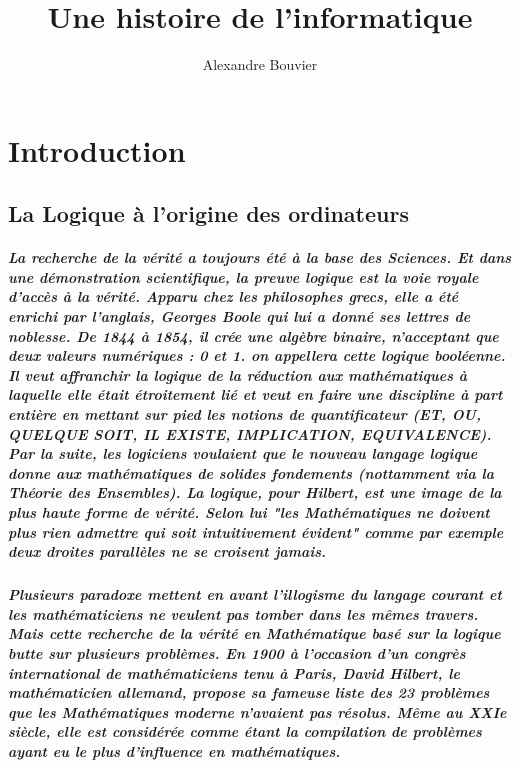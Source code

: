 \documentclass[a4paper, 11pt]{book}
\begin{document}
\title{Une histoire de l'informatique}
\author{Alexandre Bouvier}
\date{}

\mainmatter

\maketitle

\chapter*{ Introduction }

\section*{ La Logique à l'origine des ordinateurs }

\paragraph{
  La recherche de la vérité a toujours été à la base des Sciences. Et dans une démonstration scientifique, la preuve logique est la voie royale d'accès à la vérité. Apparu chez les philosophes grecs, elle a été enrichi par l'anglais, Georges Boole qui lui a donné ses lettres de noblesse. De 1844 à 1854, il crée une algèbre binaire, n'acceptant que deux valeurs numériques : 0 et 1. on appellera cette logique booléenne. Il veut affranchir la logique de la réduction aux mathématiques à laquelle elle était étroitement lié et veut en faire une discipline à part entière en mettant sur pied les notions de quantificateur (ET, OU, QUELQUE SOIT, IL EXISTE, IMPLICATION, EQUIVALENCE). Par la suite, les logiciens voulaient que le nouveau langage logique donne aux mathématiques de solides fondements (nottamment via la Théorie des Ensembles). La logique, pour Hilbert, est une image de la plus haute forme de vérité. Selon lui "les Mathématiques ne doivent plus rien admettre  qui soit intuitivement évident" comme par exemple deux droites parallèles ne se croisent jamais.
}

\paragraph{
  Plusieurs paradoxe mettent en avant l'illogisme du langage courant et les mathématiciens ne veulent pas tomber dans les mêmes travers. Mais cette recherche de la vérité en Mathématique basé sur la logique butte sur plusieurs problèmes. En 1900 à l'occasion d'un congrès international de mathématiciens tenu à Paris, David Hilbert, le mathématicien allemand, propose sa fameuse liste des 23 problèmes que les Mathématiques moderne n'avaient pas résolus. Même au XXIe siècle, elle est considérée comme étant la compilation de problèmes ayant eu le plus d'influence en mathématiques.
}
\end{document}
